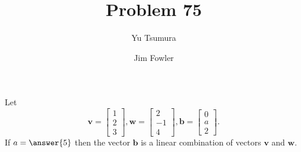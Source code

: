 \documentclass{ximera}
\title{Problem 75}
\author{Yu Tsumura \and Jim Fowler}
\begin{document}
\begin{problem}
	 
		Let
		\[\mathbf{v}=\begin{bmatrix}
		  1 \\
		   2 \\
		    3 
		  \end{bmatrix}, \mathbf{w}=\begin{bmatrix}
		  2 \\
		   -1 \\
		    4 
		  \end{bmatrix}, \mathbf{b}=\begin{bmatrix}
		  0 \\
		   a \\
		    2 
		  \end{bmatrix}.\]
                If $a = \answer{5}$ then the vector $\mathbf{b}$ is a linear combination of vectors $\mathbf{v}$ and $\mathbf{w}$.

\end{problem}
\end{document}
